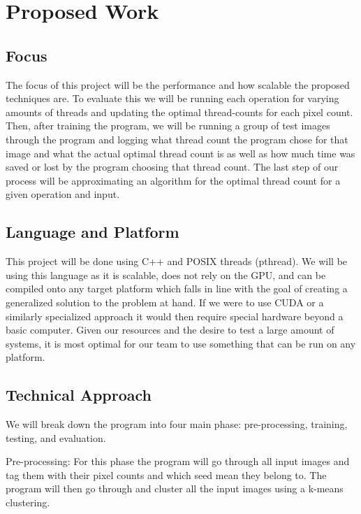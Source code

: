 \documentclass{article}
\begin{document}
    \section{Proposed Work}
        \begin{multicols}{2}
            \subsection{Focus}
                The focus of this project will be the performance and how scalable the proposed techniques are.  To evaluate this we will be running each operation for varying amounts of threads and updating the optimal thread-counts for each pixel count.  Then, after training the program, we will be running a group of test images through the program and logging what thread count the program chose for that image and what the actual optimal thread count is as well as how much time was saved or lost by the program choosing that thread count.  The last step of our process will be approximating an algorithm for the optimal thread count for a given operation and input.
            
            \subsection{Language and Platform}
                This project will be done using C++ and POSIX threads (pthread). We will be using this language as it is scalable, does not rely on the GPU, and can be compiled onto any target platform which falls in line with the goal of creating a generalized solution to the problem at hand.  If we were to use CUDA or a similarly specialized approach it would then require special hardware beyond a basic computer.  Given our resources and the desire to test a large amount of systems, it is most optimal for our team to use something that can be run on any platform.
        
            \subsection{Technical Approach}
                We will break down the program into four main phase: pre-processing, training, testing, and evaluation.
                
                Pre-processing:  For this phase the program will go through all input images and tag them with their pixel counts and which seed mean they belong to.  The program will then go through and cluster all the input images using a k-means clustering.
                

\end{multicols}
\end{document}
